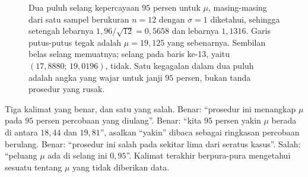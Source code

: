 \begin{figure}[htbp]
\centering
{}
\caption{Dua puluh selang kepercayaan $95$ persen untuk $\mu$, masing-masing dari satu
sampel berukuran $n=12$ dengan $\sigma=1$ diketahui, sehingga setengah lebarnya
$1{,}96/\sqrt{12}=0{,}5658$ dan lebarnya $1{,}1316$. Garis putus-putus tegak adalah
$\mu=19{,}125$ yang sebenarnya. Sembilan belas selang memuatnya; selang pada baris
ke-13, yaitu $(17{,}8880;\,19{,}0196)$, tidak. Satu kegagalan dalam dua puluh adalah
angka yang wajar untuk janji $95$ persen, bukan tanda prosedur yang rusak.}
\label{fig:dua-puluh-selang}
\end{figure}

\begin{catatan}
Tiga kalimat yang benar, dan satu yang salah. Benar: ``prosedur ini menangkap $\mu$
pada $95$ persen percobaan yang diulang''. Benar: ``kita $95$ persen yakin $\mu$
berada di antara $18{,}44$ dan $19{,}81$'', asalkan ``yakin'' dibaca sebagai ringkasan
percobaan berulang. Benar: ``prosedur ini salah pada sekitar lima dari seratus
kasus''. Salah: ``peluang $\mu$ ada di selang ini $0{,}95$''. Kalimat terakhir
berpura-pura mengetahui sesuatu tentang $\mu$ yang tidak diberikan data.
\end{catatan}

